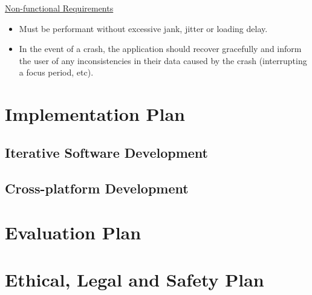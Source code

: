 \underline{Non-functional Requirements}
\begin{itemize}
    \item Must be performant without excessive jank, jitter or loading delay.
    \item In the event of a crash, the application should recover gracefully and inform the user of any inconsistencies in their data caused by the crash (interrupting a focus period, etc).
\end{itemize}


\section{Implementation Plan}
\subsection{Iterative Software Development}

\subsection{Cross-platform Development}

\section{Evaluation Plan}


\section{Ethical, Legal and Safety Plan}